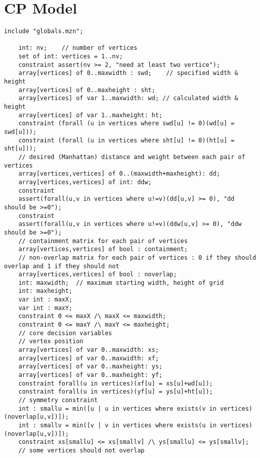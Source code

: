 \documentclass[a4paper,11pt,phdthesis,singlespace,twoside]{cssethesis}
\begin{document}
\appendix %
\chapter{CP Model} \label{app:CP}

\begin{lstlisting}
include "globals.mzn";

    int: nv;	// number of vertices
    set of int: vertices = 1..nv;
    constraint assert(nv >= 2, "need at least two vertice");
    array[vertices] of 0..maxwidth : swd;	 // specified width & height
    array[vertices] of 0..maxheight : sht;
    array[vertices] of var 1..maxwidth: wd;	// calculated width & height
    array[vertices] of var 1..maxheight: ht;
    constraint (forall (u in vertices where swd[u] != 0)(wd[u] = swd[u]));
    constraint (forall (u in vertices where sht[u] != 0)(ht[u] = sht[u]));
    // desired (Manhattan) distance and weight between each pair of vertices
    array[vertices,vertices] of 0..(maxwidth+maxheight): dd;
    array[vertices,vertices] of int: ddw;
    constraint
    assert(forall(u,v in vertices where u!=v)(dd[u,v] >= 0), "dd should be >=0");
    constraint
    assert(forall(u,v in vertices where u!=v)(ddw[u,v] >= 0), "ddw should be >=0");
    // containment matrix for each pair of vertices
    array[vertices,vertices] of bool : containment;
    // non-overlap matrix for each pair of vertices : 0 if they should overlap and 1 if they should not
    array[vertices,vertices] of bool : noverlap;
    int: maxwidth;  // maximum starting width, height of grid
    int: maxheight;
    var int : maxX;
    var int : maxY;
    constraint 0 <= maxX /\ maxX <= maxwidth;
    constraint 0 <= maxY /\ maxY <= maxheight;
    // core decision variables
    // vertex position
    array[vertices] of var 0..maxwidth: xs;
    array[vertices] of var 0..maxwidth: xf;
    array[vertices] of var 0..maxheight: ys;
    array[vertices] of var 0..maxheight: yf;
    constraint forall(u in vertices)(xf[u] = xs[u]+wd[u]);
    constraint forall(u in vertices)(yf[u] = ys[u]+ht[u]);
    // symmetry constraint
    int : smallu = min([u | u in vertices where exists(v in vertices)(noverlap[u,v])]);
    int : smallv = min([v | v in vertices where exists(u in vertices)(noverlap[u,v])]);
    constraint xs[smallu] <= xs[smallv] /\ ys[smallu] <= ys[smallv];
    // some vertices should not overlap

\end{lstlisting}
\end{document}
